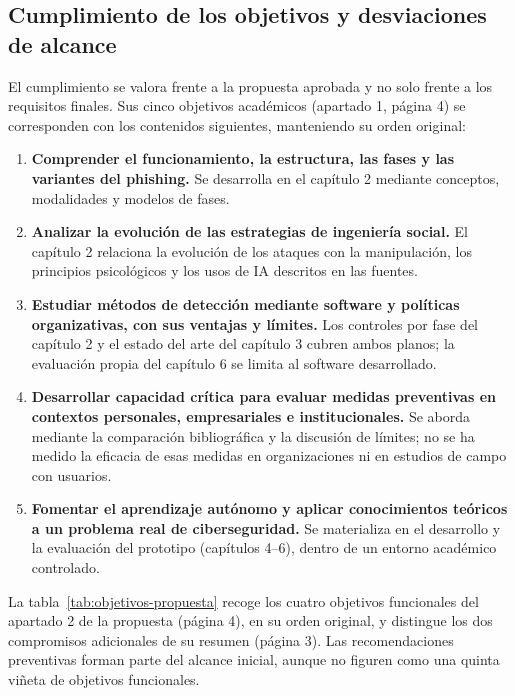 \subsection{Cumplimiento de los objetivos y desviaciones de alcance}
\label{sec:objetivos-propuesta}

El cumplimiento se valora frente a la propuesta aprobada y no solo frente a los requisitos finales. Sus cinco objetivos académicos (apartado 1, página 4) se corresponden con los contenidos siguientes, manteniendo su orden original:

\begin{enumerate}[leftmargin=*,itemsep=3pt]
\item \textbf{Comprender el funcionamiento, la estructura, las fases y las variantes del phishing.} Se desarrolla en el capítulo 2 mediante conceptos, modalidades y modelos de fases.
\item \textbf{Analizar la evolución de las estrategias de ingeniería social.} El capítulo 2 relaciona la evolución de los ataques con la manipulación, los principios psicológicos y los usos de IA descritos en las fuentes.
\item \textbf{Estudiar métodos de detección mediante software y políticas organizativas, con sus ventajas y límites.} Los controles por fase del capítulo 2 y el estado del arte del capítulo 3 cubren ambos planos; la evaluación propia del capítulo 6 se limita al software desarrollado.
\item \textbf{Desarrollar capacidad crítica para evaluar medidas preventivas en contextos personales, empresariales e institucionales.} Se aborda mediante la comparación bibliográfica y la discusión de límites; no se ha medido la eficacia de esas medidas en organizaciones ni en estudios de campo con usuarios.
\item \textbf{Fomentar el aprendizaje autónomo y aplicar conocimientos teóricos a un problema real de ciberseguridad.} Se materializa en el desarrollo y la evaluación del prototipo (capítulos 4--6), dentro de un entorno académico controlado.
\end{enumerate}

La tabla~\ref{tab:objetivos-propuesta} recoge los cuatro objetivos funcionales del apartado 2 de la propuesta (página 4), en su orden original, y distingue los dos compromisos adicionales de su resumen (página 3). Las recomendaciones preventivas forman parte del alcance inicial, aunque no figuren como una quinta viñeta de objetivos funcionales.

